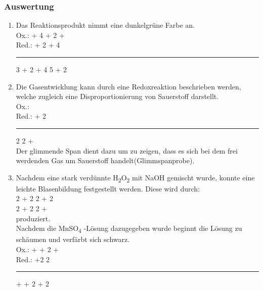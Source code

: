 \documentclass{scrartcl}
\begin{document}
 \subsubsection{Auswertung}
 \begin{enumerate}[label=\alph*)]
	 \item Das Reaktionsprodukt nimmt eine dunkelgrüne Farbe an.\\
	Ox.:  + 4 \ch{<=>}  + 2 +  \\
	Red.:  + 2  + 4 \\
	\noindent\rule{\textwidth}{0.4pt}
	3 + 2 + 4 \ch{<=>} 5 + 2 
	 \item Die Gasentwicklung kann durch eine Redoxreaktion beschrieben werden, welche zugleich eine Disproportionierung von Sauerstoff darstellt. \\
		 Ox.: \ch{<=>} \\
		 Red.:  +  2 \\ 
\noindent\rule{\textwidth}{0.4pt}
2 \ch{<=>} 2 +  \\
Der glimmende Span dient dazu um zu zeigen, dass es sich bei dem frei werdenden Gas um Sauerstoff handelt(Glimmspanprobe).
\item Nachdem eine stark verdünnte H\textsubscript{2}O\textsubscript{2} mit NaOH gemischt wurde, konnte eine leichte Blasenbildung festgestellt werden. Diese wird durch:\\
	2 + 2 \ch{<=>} 2 + 2 \\
	2 + 2 \ch{<=>} 2 + \\
produziert.\\
Nachdem die MnSO\textsubscript{4} -Lösung dazugegeben wurde beginnt die Lösung zu schäumen und verfärbt sich schwarz.\\
Ox.:  + \ch{<=>}  + 2 +  \\ 
Red.:  +2 2 \\
\noindent\rule{\textwidth}{0.4pt}
 +  + 2 \ch{<=>}  + 2 \\

\end{enumerate}
\end{document}

